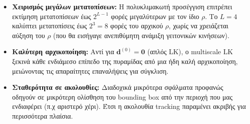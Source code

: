 \documentclass[12pt]{article}
\begin{document}
\begin{itemize}
    \item \textbf{Χειρισμός μεγάλων μετατοπίσεων:} Η πολυκλιμακωτή προσέγγιση επιτρέπει εκτίμηση μετατοπίσεων έως $2^{L-1}$ φορές μεγαλύτερων με τον ίδιο $\rho$. Το $L=4$ καλύπτει μετατοπίσεις έως $2^3=8$ φορές του αρχικού $\rho$, χωρίς να χρειάζεται αύξηση του $\rho$ (που θα εισήγαγε ανεπιθύμητη ανάμιξη γειτονικών κινήσεων).

    \item \textbf{Καλύτερη αρχικοποίηση:} Αντί για $\mathbf{d}^{(0)} = \mathbf{0}$ (απλός LK), ο multiscale LK ξεκινά κάθε ενδιάμεσο επίπεδο της πυραμίδας από μια ήδη καλή αρχικοποίηση, μειώνοντας τις απαραίτητες επαναλήψεις για σύγκλιση.

    \item \textbf{Σταθερότητα σε ακολουθίες:} Διαδοχικά μικρότερα σφάλματα προφανώς οδηγούν σε μικρότερη ολίσθηση του bounding box από την περιοχή που μας ενδιαφέρει (π.χ αριστερό χέρι). Έτσι η ακολουθία tracking παραμένει ακριβής για περισσότερα πλαίσια.

\end{itemize}
\end{document}
